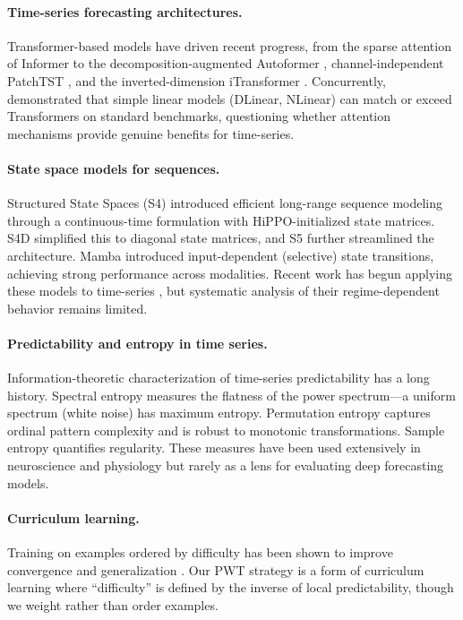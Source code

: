 \documentclass[10pt]{article}
\newcommand{\pwt}{\textsc{PWT}}
\begin{document}
\paragraph{Time-series forecasting architectures.}
Transformer-based models have driven recent progress, from the sparse attention of Informer \citep{zhou2021informer} to the decomposition-augmented Autoformer \citep{wu2021autoformer}, channel-independent PatchTST \citep{nie2023patchtst}, and the inverted-dimension iTransformer \citep{liu2024itransformer}. Concurrently, \citet{zeng2023transformers} demonstrated that simple linear models (DLinear, NLinear) can match or exceed Transformers on standard benchmarks, questioning whether attention mechanisms provide genuine benefits for time-series.

\paragraph{State space models for sequences.}
Structured State Spaces (S4) \citep{gu2022efficiently} introduced efficient long-range sequence modeling through a continuous-time formulation with HiPPO-initialized state matrices. S4D \citep{gu2022parameterization} simplified this to diagonal state matrices, and S5 \citep{smith2023s5} further streamlined the architecture. Mamba \citep{gu2023mamba} introduced input-dependent (selective) state transitions, achieving strong performance across modalities. Recent work has begun applying these models to time-series \citep{wang2024mambats}, but systematic analysis of their regime-dependent behavior remains limited.

\paragraph{Predictability and entropy in time series.}
Information-theoretic characterization of time-series predictability has a long history. Spectral entropy measures the flatness of the power spectrum---a uniform spectrum (white noise) has maximum entropy. Permutation entropy \citep{bandt2002permutation} captures ordinal pattern complexity and is robust to monotonic transformations. Sample entropy \citep{richman2000physiological} quantifies regularity. These measures have been used extensively in neuroscience and physiology but rarely as a lens for evaluating deep forecasting models.

\paragraph{Curriculum learning.}
Training on examples ordered by difficulty has been shown to improve convergence and generalization \citep{bengio2009curriculum}. Our \pwt{} strategy is a form of curriculum learning where ``difficulty'' is defined by the inverse of local predictability, though we weight rather than order examples.
\end{document}
